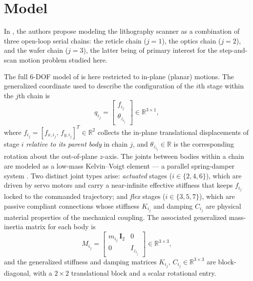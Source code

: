 \documentclass[11pt]{article}
\theoremstyle{definition}
\begin{document}
\section{Model}

In \cite{Al-Rawashdeh2022_Caracterization}, the authors propose modeling the lithography scanner as a combination of three open-loop serial chains: the reticle chain ($j=1$), the optics chain ($j=2$), and the wafer chain ($j=3$), the latter being of primary interest for the step-and-scan motion problem studied here.

The full 6-DOF model of \cite{Al-Rawashdeh2022_Caracterization} is here restricted to in-plane (planar) motions. The generalized coordinate used to describe the configuration of the $i$th stage within the $j$th chain is
\begin{equation}
    q_{i_j} = \begin{bmatrix} f_{i_j} \\ \theta_{z_{i_j}} \end{bmatrix} \in \mathbb{R}^{3\times1},
\end{equation}
where $f_{i_j} = [f_{x,i_j},\, f_{y,i_j}]^T \in \mathbb{R}^{2}$ collects the in-plane translational displacements of stage $i$ \emph{relative to its parent body} in chain $j$, and $\theta_{z_{i_j}} \in \mathbb{R}$ is the corresponding rotation about the out-of-plane $z$-axis. The joints between bodies within a chain are modeled as a low-mass Kelvin--Voigt element — a parallel spring-damper system \cite{Al-Rawashdeh2022_Caracterization}. Two distinct joint types arise: \emph{actuated} stages ($i \in \{2,4,6\}$), which are driven by servo motors and carry a near-infinite effective stiffness that keeps $f_{i_j}$ locked to the commanded trajectory; and \emph{flex} stages ($i \in \{3,5,7\}$), which are passive compliant connections whose stiffness $K_{i_j}$ and damping $C_{i_j}$ are physical material properties of the mechanical coupling. The associated generalized mass-inertia matrix for each body is
\begin{equation}
    M_{i_j} = \begin{bmatrix} m_{i_j}\,\mathbf{I}_2 & 0 \\ 0 & I_{z_{i_j}} \end{bmatrix} \in \mathbb{R}^{3\times3},
\end{equation}
and the generalized stiffness and damping matrices $K_{i_j},\, C_{i_j} \in \mathbb{R}^{3\times3}$ are block-diagonal, with a $2\times2$ translational block and a scalar rotational entry.
\end{document}
